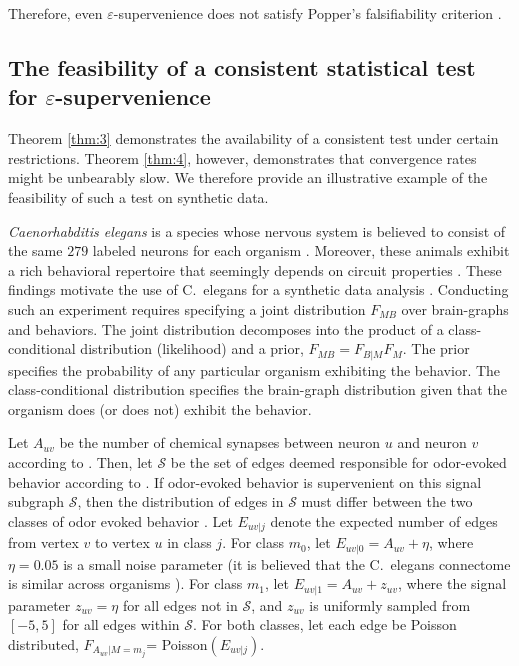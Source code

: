 \documentclass{article}
\providecommand{\mc}[1]{\mathcal{#1}}
\newcommand{\eps}{\varepsilon}
\begin{document}
Therefore, even $\eps$-supervenience does not satisfy Popper's falsifiability criterion \cite{Popper1959}.


\subsection*{The feasibility of a consistent statistical test for $\eps$-supervenience} %


Theorem \ref{thm:3} demonstrates the availability of a consistent test under certain restrictions.  Theorem \ref{thm:4}, however, demonstrates that convergence rates might be unbearably slow.  We therefore provide an illustrative example of the feasibility of such a test on synthetic data.

{\it Caenorhabditis elegans} is a species whose nervous system is believed to consist of the same $279$ labeled neurons for each organism \cite{Durbin87}. Moreover, these animals exhibit a rich behavioral repertoire that seemingly depends on circuit properties \cite{deBonoMaricq05}.  These findings motivate the use of C.~elegans for a synthetic data analysis \cite{GelmanShalizi11}.  Conducting such an experiment requires specifying a joint distribution $F_{MB}$ over brain-graphs and behaviors.  The joint distribution decomposes into the product of a class-conditional distribution (likelihood) and a prior, $F_{MB}=F_{B|M}F_M$. The prior  specifies the probability of any particular organism exhibiting the behavior.  The class-conditional distribution specifies the brain-graph distribution given that the organism does (or does not) exhibit the behavior. 

Let $A_{uv}$ be the number of chemical synapses between neuron $u$ and neuron $v$ according to \cite{VarshneyChklovskii09}.  Then, let $\mc{S}$ be the set of edges deemed responsible for odor-evoked behavior according to \cite{ChalasaniBargmann07}.  If odor-evoked behavior is supervenient on this signal subgraph $\mc{S}$, then the distribution of edges in $\mc{S}$ must differ between the two classes of odor evoked behavior \cite{VP11_sigsub}.  Let $E_{uv|j}$ denote the expected number of edges from vertex $v$ to vertex $u$ in class $j$.   For class $m_0$, let $E_{uv|0}=A_{uv}+\eta$,  where $\eta=0.05$ is a small noise parameter  (it is believed that the C.~elegans connectome is similar across organisms \cite{Durbin87}). For class $m_1$, let $E_{uv|1}=A_{uv}+z_{uv}$, where the signal parameter $z_{uv}=\eta$ for all edges not in $\mc{S}$, and $z_{uv}$ is uniformly sampled from $[-5,5]$ for all edges within $\mc{S}$. For both classes, let each edge be Poisson distributed, $F_{A_{uv}|M=m_j}$= Poisson$(E_{uv|j})$.
\end{document}
